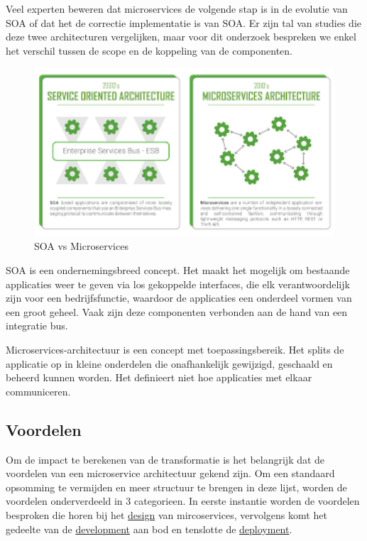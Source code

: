 Veel experten beweren dat microservices de volgende stap is in de evolutie van SOA of dat het de correctie implementatie is van SOA. Er zijn tal van studies die deze twee architecturen vergelijken, maar voor dit onderzoek bespreken we enkel het verschil tussen de scope en de koppeling van de componenten. \textcite{Education2019}
\begin{figure}
    \caption{SOA vs Microservices}
    \includegraphics[width=1\textwidth]{SOAvsMicropng.png}
\end{figure}

SOA is een ondernemingsbreed concept. Het maakt het mogelijk om bestaande applicaties weer te geven via los gekoppelde interfaces, die elk verantwoordelijk zijn voor een bedrijfsfunctie, waardoor de applicaties een onderdeel vormen van een groot geheel. Vaak zijn deze componenten verbonden aan de hand van een integratie bus.

Microservices-architectuur is een concept met toepassingsbereik. Het splits de applicatie op in kleine onderdelen die onafhankelijk gewijzigd, geschaald en beheerd kunnen worden. Het definieert niet hoe applicaties met elkaar communiceren.


\subsection{Voordelen}
Om de impact te berekenen van de transformatie is het belangrijk dat de voordelen van een microservice architectuur gekend zijn. Om een standaard opsomming te vermijden en meer structuur te brengen in deze lijst, worden de voordelen onderverdeeld in 3 categorieen. In eerste instantie worden de voordelen besproken die horen bij het \underline{design} van mircoservices, vervolgens komt het gedeelte van de \underline{development} aan bod en tenslotte de \underline{deployment}.\\

